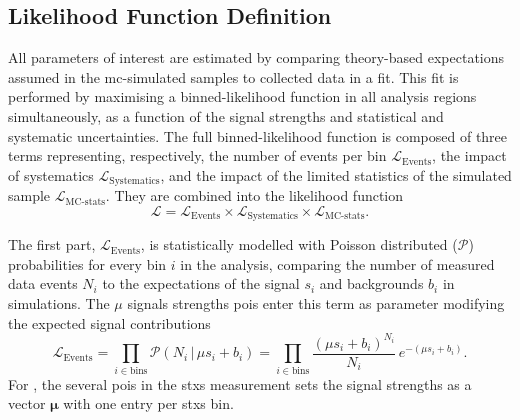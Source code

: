 \subsection{Likelihood Function Definition}\label{subsec-likelidef}
All parameters of interest are estimated by comparing theory-based expectations assumed in the \gls{mc}-simulated samples to collected data in a fit. This fit is performed by maximising a binned-likelihood function in all analysis regions simultaneously, as a function of the signal strengths and statistical and systematic uncertainties. The full binned-likelihood function is composed of three terms representing, respectively, the number of events per bin $\mathcal{L}_{\text{Events}}$, the impact of systematics $\mathcal{L}_{\text{Systematics}}$, and the impact of the limited statistics of the simulated sample $\mathcal{L}_{\text{MC-stats}}$. They are combined into the likelihood function
\begin{equation}\label{eq-simp-like-func}
    \mathcal{L} = \mathcal{L}_{\text{Events}} \times \mathcal{L}_{\text{Systematics}} \times \mathcal{L}_{\text{MC-stats}}.
\end{equation}

The first part, $\mathcal{L}_{\text{Events}}$, is statistically modelled with Poisson distributed ($\mathcal{P}$) probabilities for every bin $i$ in the analysis, comparing the number of measured data events $N_i$ to the expectations of the signal $s_i$ and backgrounds $b_i$ in simulations. The $\mu$ signals strengths \glspl{poi} enter this term as parameter modifying the expected signal contributions \[\mathcal{L}_{\text{Events}} = \prod_{i\in \textrm{bins}} \mathcal{P}(N_i \,|\, \mu s_i + b_i) = \prod_{i\in \textrm{bins}} \frac{\left(\mu s_i + b_i\right)^{N_i}}{N_i} \, e^{-\left(\mu s_i + b_i\right)}.\] For \vhb, the several \glspl{poi} in the \gls{stxs} measurement sets the signal strengths as a vector $\boldsymbol{\mu}$ with one entry per \gls{stxs} bin. \\

